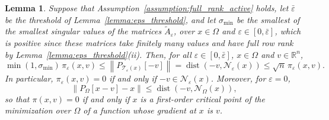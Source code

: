 \documentclass{article}
\numberwithin{equation}{section}
\newcommand{\RR}{{\mathbb{R}}} %
\newcommand{\calN}{{\mathcal{N}}}
\newcommand{\calT}{{\mathcal{T}}}
\newcommand{\proj}[2]{P_{#1} \left[ {#2} \right]} %
\theoremstyle{plain}
\newtheorem{lemma}[theorem]{Lemma}
\begin{document}
\begin{lemma}\label{lemma:certification}
	Suppose that Assumption~\ref{assumption:full_rank_active} holds, let $\bar\varepsilon$ be the threshold of Lemma~\ref{lemma:eps_threshold}, and let $\sigma_{\min}$ be the smallest of the smallest singular values of the matrices $\tilde{A}_\varepsilon$, over $x \in \Omega$ and $\varepsilon \in [0,\bar\varepsilon]$, which is positive since these matrices take finitely many values and have full row rank by Lemma~\ref{lemma:eps_threshold}(ii). Then, for all $\varepsilon \in [0,\bar\varepsilon]$, $x \in \Omega$ and $v \in \RR^n$,
	\begin{equation}\label{eq:certification}
		\min(1,\sigma_{\min})\,\pi_\varepsilon(x,v) \le \left\|\proj{\calT_\varepsilon(x)}{-v}\right\| = \operatorname{dist}\left(-v,\calN_\varepsilon(x)\right) \le \sqrt{n}\,\pi_\varepsilon(x,v).
	\end{equation}
	In particular, $\pi_\varepsilon(x,v) = 0$ if and only if $-v \in \calN_\varepsilon(x)$. Moreover, for $\varepsilon = 0$,
	\begin{equation}\label{eq:proj_grad_le_dist}
		\|\proj{\Omega}{x-v}-x\| \le \operatorname{dist}\left(-v,\calN_\Omega(x)\right),
	\end{equation}
	so that $\pi(x,v) = 0$ if and only if $x$ is a first-order critical point of the minimization over $\Omega$ of a function whose gradient at $x$ is $v$.
\end{lemma}
\end{document}
